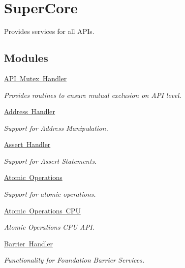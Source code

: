 \hypertarget{group__RTEMSScore}{}\section{Super\+Core}
\label{group__RTEMSScore}


Provides services for all A\+P\+Is.  


\subsection*{Modules}
\begin{DoxyCompactItemize}
\item 
\mbox{\hyperlink{group__RTEMSScoreAPIMutex}{A\+P\+I Mutex Handler}}
\begin{DoxyCompactList}\small\item\em Provides routines to ensure mutual exclusion on A\+PI level. \end{DoxyCompactList}\item 
\mbox{\hyperlink{group__RTEMSScoreAddress}{Address Handler}}
\begin{DoxyCompactList}\small\item\em Support for Address Manipulation. \end{DoxyCompactList}\item 
\mbox{\hyperlink{group__RTEMSScoreAssert}{Assert Handler}}
\begin{DoxyCompactList}\small\item\em Support for Assert Statements. \end{DoxyCompactList}\item 
\mbox{\hyperlink{group__RTEMSScoreAtomic}{Atomic Operations}}
\begin{DoxyCompactList}\small\item\em Support for atomic operations. \end{DoxyCompactList}\item 
\mbox{\hyperlink{group__RTEMSScoreCPUAtomic}{Atomic Operations C\+PU}}
\begin{DoxyCompactList}\small\item\em Atomic Operations C\+PU A\+PI. \end{DoxyCompactList}\item 
\mbox{\hyperlink{group__RTEMSScoreBarrier}{Barrier Handler}}
\begin{DoxyCompactList}\small\item\em Functionality for Foundation Barrier Services. \end{DoxyCompactList}\item 

\end{DoxyCompactItemize}
